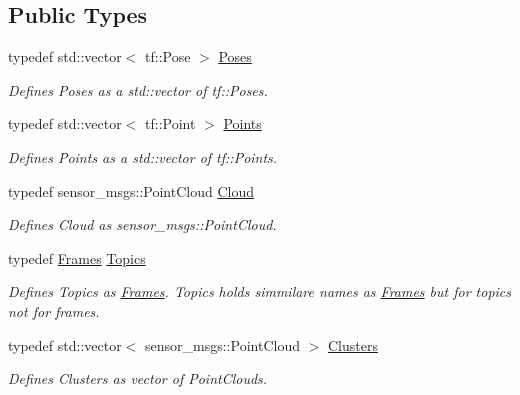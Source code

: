 \subsection*{Public Types}
\begin{DoxyCompactItemize}
\item 
typedef std\+::vector$<$ tf\+::\+Pose $>$ \hyperlink{classLaserPredictor_a6c7dc6bd4bfb6acd3d95e88e1b9b4be2}{Poses}\hypertarget{classLaserPredictor_a6c7dc6bd4bfb6acd3d95e88e1b9b4be2}{}\label{classLaserPredictor_a6c7dc6bd4bfb6acd3d95e88e1b9b4be2}

\begin{DoxyCompactList}\small\item\em Defines Poses as a std\+::vector of tf\+::\+Poses. \end{DoxyCompactList}\item 
typedef std\+::vector$<$ tf\+::\+Point $>$ \hyperlink{classLaserPredictor_ae2e95d6f06a21cf4a0b0bb0e369270b4}{Points}\hypertarget{classLaserPredictor_ae2e95d6f06a21cf4a0b0bb0e369270b4}{}\label{classLaserPredictor_ae2e95d6f06a21cf4a0b0bb0e369270b4}

\begin{DoxyCompactList}\small\item\em Defines Points as a std\+::vector of tf\+::\+Points. \end{DoxyCompactList}\item 
typedef sensor\+\_\+msgs\+::\+Point\+Cloud \hyperlink{classLaserPredictor_ae6d64da5bf82f544a2ea8a421af5a677}{Cloud}\hypertarget{classLaserPredictor_ae6d64da5bf82f544a2ea8a421af5a677}{}\label{classLaserPredictor_ae6d64da5bf82f544a2ea8a421af5a677}

\begin{DoxyCompactList}\small\item\em Defines Cloud as sensor\+\_\+msgs\+::\+Point\+Cloud. \end{DoxyCompactList}\item 
typedef \hyperlink{structLaserPredictor_1_1Frames}{Frames} \hyperlink{classLaserPredictor_a3d60b85935a522f854a8f0a34bb7b3ca}{Topics}\hypertarget{classLaserPredictor_a3d60b85935a522f854a8f0a34bb7b3ca}{}\label{classLaserPredictor_a3d60b85935a522f854a8f0a34bb7b3ca}

\begin{DoxyCompactList}\small\item\em Defines Topics as \hyperlink{structLaserPredictor_1_1Frames}{Frames}. Topics holds simmilare names as \hyperlink{structLaserPredictor_1_1Frames}{Frames} but for topics not for frames. \end{DoxyCompactList}\item 
typedef std\+::vector$<$ sensor\+\_\+msgs\+::\+Point\+Cloud $>$ \hyperlink{classLaserPredictor_ab05e971dfcde2d9abbabe861681a541c}{Clusters}\hypertarget{classLaserPredictor_ab05e971dfcde2d9abbabe861681a541c}{}\label{classLaserPredictor_ab05e971dfcde2d9abbabe861681a541c}

\begin{DoxyCompactList}\small\item\em Defines Clusters as vector of Point\+Clouds. \end{DoxyCompactList}\end{DoxyCompactItemize}
